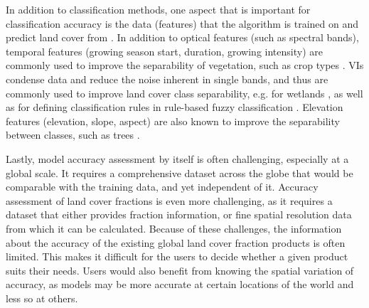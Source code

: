 \documentclass[review,authoryear,3p]{elsarticle}
\begin{document}
In addition to classification methods, one aspect that is important for classification accuracy is the data (features) that the algorithm is trained on and predict land cover from \citep{yu2014metadiscoveries}.
In addition to optical features (such as spectral bands), temporal features (growing season start, duration, growing intensity) are commonly used to improve the separability of vegetation, such as crop types \citep{jakubauskas2001harmonic}.
\Glspl{VI} condense data and reduce the noise inherent in single bands, and thus are commonly used to improve land cover class separability, e.g. for wetlands \citep{sader1995wetlands}, as well as for defining classification rules in rule-based fuzzy classification \citep{baraldi2006rulebased}.
Elevation features (elevation, slope, aspect) are also known to improve the separability between classes, such as trees \citep{burrough2001fuzzy}.

Lastly, model accuracy assessment by itself is often challenging, especially at a global scale.
It requires a comprehensive dataset across the globe that would be comparable with the training data, and yet independent of it.
Accuracy assessment of land cover fractions is even more challenging, as it requires a dataset that either provides fraction information, or fine spatial resolution data from which it can be calculated.
Because of these challenges, the information about the accuracy of the existing global land cover fraction products is often limited.
This makes it difficult for the users to decide whether a given product suits their needs.
Users would also benefit from knowing the spatial variation of accuracy, as models may be more accurate at certain locations of the world and less so at others.

\end{document}

